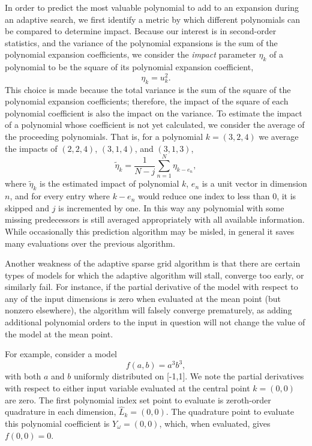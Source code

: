 In order to predict the most valuable polynomial to add to an expansion during an adaptive search, we first
identify a metric by which different polynomials can be compared to determine impact.  Because our interest 
is in second-order statistics, and the variance of the
polynomial expansions is the sum of the polynomial expansion coefficients, we consider the \emph{impact}
parameter
$\eta_k$ of a polynomial to be the square of its polynomial expansion coefficient,
\begin{equation}\label{eq: act poly impact}
  \eta_k = u_k^2.
\end{equation}
This choice is made because the total variance is the sum of the square of the polynomial expansion
coefficients; therefore, the impact of the square of each polynomial coefficient is also the impact on
the variance.
To estimate the impact of a polynomial whose coefficient is not yet calculated, we consider the average of the
 proceeding polynomials.  That is, for a polynomial $k=(3,2,4)$ we average the impacts of $(2,2,4)$, $(3,1,4)$,
and $(3,1,3)$,
\begin{equation}\label{eq: poly impact}
  \tilde \eta_k = \frac{1}{N-j}\sum_{n=1}^N \eta_{k-e_n},
\end{equation}
where $\tilde \eta_k$ is the estimated impact of polynomial $k$, $e_n$ is a unit vector in dimension $n$, and
for every entry where $k-e_n$ would reduce one index to less than 0, it is skipped and $j$ is incremented by
one.  In this way any polynomial with some missing predecessors is still averaged appropriately with all
available information.  While occasionally this prediction algorithm may be misled, in general it saves
many evaluations over the previous algorithm.

Another weakness of the adaptive sparse grid algorithm is that 
there are certain types of models for which the adaptive algorithm will stall, converge too early, or
similarly fail.  For instance, if the partial derivative of the model with respect to any of the
input dimensions is zero when evaluated at the mean point (but nonzero elsewhere), the algorithm will falsely
converge prematurely, as adding additional polynomial orders to the input in question will not change the
value of the model at the mean point.

For example, consider a model
\begin{equation}
  f(a,b) = a^3b^3,
\end{equation}
with both $a$ and $b$ uniformly distributed on [-1,1].  We note the partial derivatives with respect to either
input variable evaluated at the central point $k=(0,0)$ are zero.  The first polynomial index set point to
evaluate is zeroth-order quadrature in each dimension, $\hat L_k=(0,0)$.
The quadrature point to
evaluate this polynomial coefficient is $Y_\omega=(0,0)$, which, when evaluated, gives $f(0,0)=0$.  

